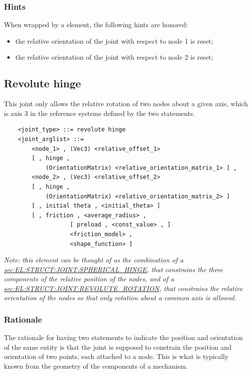\subsubsection{Hints}
When wrapped by a  element, the following hints are honored:
\begin{itemize}
\item {} the relative orientation of the joint
with respect to node 1 is reset;
\item {} the relative orientation of the joint
with respect to node 2 is reset;
\end{itemize}

\subsection{Revolute hinge}
\label{sec:EL:STRUCT:JOINT:REVOLUTE_HINGE}
This joint only allows the relative rotation of two nodes about
a given axis, which is axis 3 in the reference systems defined 
by the two  statements.
\begin{verbatim}
    <joint_type> ::= revolute hinge
    <joint_arglist> ::= 
        <node_1> , (Vec3) <relative_offset_1> 
        [ , hinge , 
            (OrientationMatrix) <relative_orientation_matrix_1> ] ,
        <node_2> , (Vec3) <relative_offset_2>
        [ , hinge , 
            (OrientationMatrix) <relative_orientation_matrix_2> ]
        [ , initial theta , <initial_theta> ]
        [ , friction , <average_radius> , 
                   [ preload , <const_value> , ]
                   <friction_model> , 
                   <shape_function> ]
\end{verbatim}

\emph{Note: this element can be thought of as the combination of a 
\hyperref{\kw{spherical hinge}}{\kw{spherical hinge} (see Section~}{)}{sec:EL:STRUCT:JOINT:SPHERICAL_HINGE},
that constrains the three components of the relative position
of the nodes, and of a
\hyperref{\kw{revolute rotation}}{\kw{revolute rotation} (see Section~}{)}{sec:EL:STRUCT:JOINT:REVOLUTE_ROTATION},
that constrains the relative orientation of the nodes so that only rotation
about a common axis is allowed.}

\subsubsection{Rationale}
The rationale for having two statements to indicate the position
and orientation of the same entity is that the joint is supposed
to constrain the position and orientation of two points,
each attached to a node.
This is what is typically known from the geometry of the components
of a mechanism.

